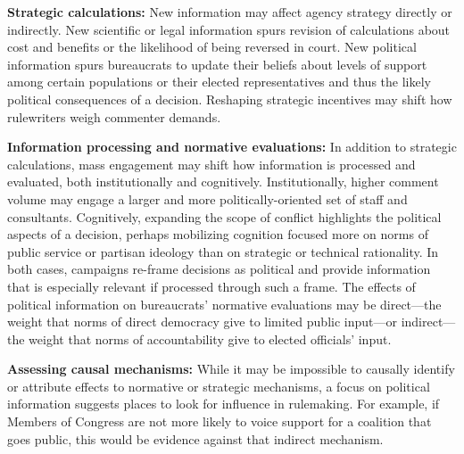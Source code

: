 \textbf{Strategic calculations:} 
New information may affect agency strategy directly or indirectly. New scientific or legal information spurs revision of calculations about cost and benefits or the likelihood of being reversed in court. New political information spurs bureaucrats to update their beliefs about levels of support among certain populations or their elected representatives and thus the likely political consequences of a decision.
Reshaping strategic incentives may shift how rulewriters weigh commenter demands.

\textbf{Information processing and normative evaluations:} 
In addition to strategic calculations, mass engagement may shift how information is processed and evaluated, both institutionally and cognitively.
Institutionally, higher comment volume may engage a larger and more politically-oriented set of staff and consultants. Cognitively, expanding the scope of conflict highlights the political aspects of a decision, perhaps mobilizing cognition focused more on norms of public service or partisan ideology than on strategic or technical rationality. In both cases, campaigns re-frame decisions as political and provide information that is especially relevant if processed through such a frame.
The effects of political information on bureaucrats' normative evaluations may be
direct---the weight that norms of direct democracy give to limited public input---or 
indirect---the weight that norms of accountability give to elected officials' input.


\textbf{Assessing causal mechanisms:}
While it may be impossible to causally identify or attribute effects to normative or strategic mechanisms, 
a focus on political information suggests places to look for influence in rulemaking. For example, if Members of Congress are not more likely to voice support for a coalition that goes public, this would be evidence against that indirect mechanism.

